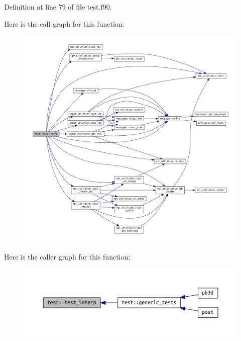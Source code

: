 Definition at line 79 of file test.\+f90.

Here is the call graph for this function\+:
\nopagebreak
\begin{figure}[H]
\begin{center}
\leavevmode
\includegraphics[width=350pt]{namespacetest_af72aaa5773b5bef2ac8d25fd05378439_cgraph}
\end{center}
\end{figure}
Here is the caller graph for this function\+:
\nopagebreak
\begin{figure}[H]
\begin{center}
\leavevmode
\includegraphics[width=350pt]{namespacetest_af72aaa5773b5bef2ac8d25fd05378439_icgraph}
\end{center}
\end{figure}
\mbox{\label{namespacetest_ac574f08ba400cd61070a6a6f13f6f7ee}} 
